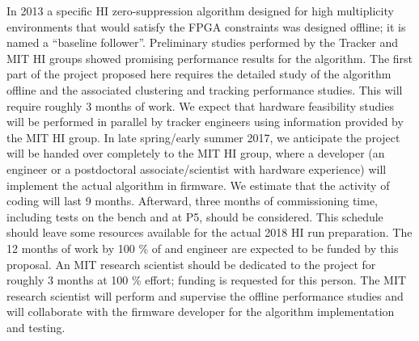 In 2013 a specific HI zero-suppression algorithm designed for high multiplicity environments that would satisfy the FPGA constraints was designed offline; it is named a ``baseline follower''.  Preliminary studies performed by the Tracker and MIT HI groups showed promising performance results for the algorithm. The first part of the project proposed here requires the detailed study of the algorithm offline and the associated  clustering and tracking performance studies. This will require roughly 3 months of work. We expect that hardware feasibility studies will be performed in parallel by tracker engineers using information provided by the MIT HI group. In late spring/early summer 2017, we anticipate the project will be handed over completely to the MIT HI group, where a developer (an engineer or a postdoctoral associate/scientist with hardware experience) will implement the actual algorithm in firmware. We estimate that the activity of coding will last 9 months. Afterward, three months of commissioning time, including tests on the bench and at P5, should be considered. This schedule should leave some resources available for the actual 2018 HI run preparation. The 12 months of work by 100 \% of and engineer are expected to be funded by this proposal. An MIT research scientist should be dedicated to the project for roughly 3 months at 100 \% effort; funding is requested for this person. The MIT research scientist will perform and supervise the offline performance studies and will collaborate with the firmware developer for the algorithm implementation and testing.  

